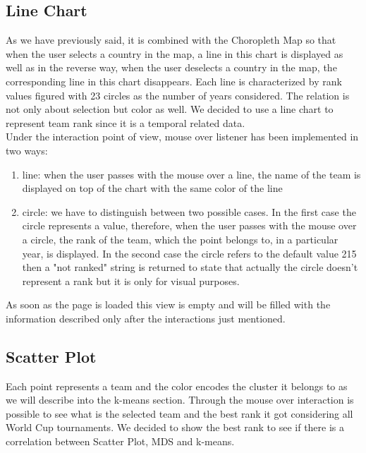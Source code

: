 \documentclass[journal]{vgtc}                %
\begin{document}
\subsection{Line Chart}
As we have previously said, it is combined with the Choropleth Map so that when the user selects a country in the map, a line in this chart is displayed as well as in the reverse way, when the user deselects a country in the map, the corresponding line in this chart disappears.
Each line is characterized by rank values figured with 23 circles as the number of years considered. The relation is not only about selection but color as well.
We decided to use a line chart to represent team rank since it is a temporal related data. \\
Under the interaction point of view, mouse over listener has been implemented in two ways:
\begin{enumerate}
\item line: when the user passes with the mouse over a line, the name of the team is displayed on top of the chart with the same color of the line
\item circle: we have to distinguish between two possible cases. In the first case the circle represents a value, therefore, when the user passes with the mouse over a circle, the rank of the team, which the point belongs to,  in a particular year, is displayed. In the second  case the circle refers to the default value 215 then a "not ranked" string is returned to state that actually the circle doesn't represent a rank but it is only for visual purposes.
\end{enumerate}
As soon as the page is loaded this view is empty and will be filled with the information described only after the interactions just mentioned.
\subsection{Scatter Plot}
Each point represents a team and the color encodes the cluster it belongs to as we will describe into the k-means section.
Through the mouse over interaction is possible to see what is the selected team and the best rank it got considering all World Cup tournaments. We decided to show the best rank to see if there is a correlation between Scatter Plot, MDS and k-means.
\end{document}
